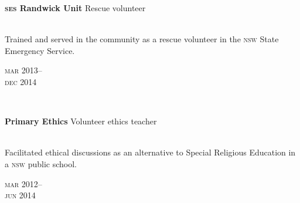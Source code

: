 \begin{minipage}[t]{\mainboxwidth\textwidth}
\textbf{\textsc{ses} Randwick Unit}\phantom{..} Rescue volunteer\\
\\
{\small
Trained and served in the community as a rescue volunteer in the \textsc{nsw} State Emergency Service.
\par}
\end{minipage}
\begin{minipage}[t]{\detailboxwidth\textwidth}
{
\hfill \textsc{mar} 2013--\\ 
\hspace*{0pt} \hfill \textsc{dec} 2014
\par
}
\end{minipage}
\\

\begin{minipage}[t]{\mainboxwidth\textwidth}
\textbf{Primary Ethics}\phantom{..} Volunteer ethics teacher\\
\\
{\small
Facilitated ethical discussions as an alternative to Special Religious Education in a \textsc{nsw} public school.  
\par}
\end{minipage}
\begin{minipage}[t]{\detailboxwidth\textwidth}
{
\hfill \textsc{mar} 2012--\\ 
\hspace*{0pt} \hfill \textsc{jun} 2014
\par
}
\end{minipage}


